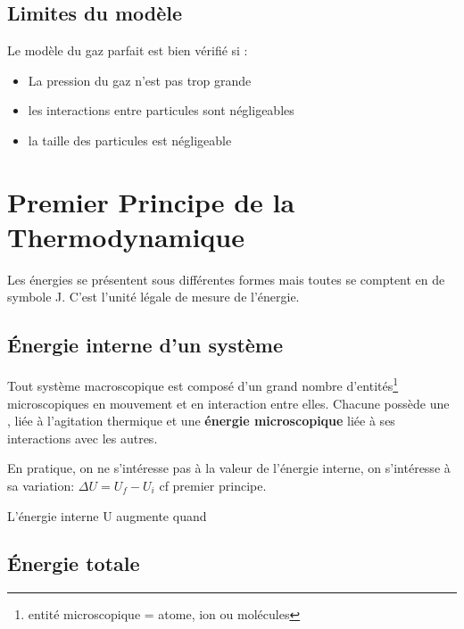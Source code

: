 \subsection{Limites du modèle}

Le modèle du gaz parfait est bien vérifié si :
\begin{itemize}
	\item La pression du gaz n'est pas trop grande
	\item les interactions entre particules sont négligeables
	\item la taille des particules est négligeable
\end{itemize}

\section{Premier Principe de la Thermodynamique}
 Les énergies se présentent sous différentes formes  mais toutes se comptent en  de symbole J. C'est l'unité légale de mesure de l'énergie.

\subsection{Énergie interne d'un système }
Tout système macroscopique est composé d'un grand nombre d'entités\footnote{entité microscopique = atome, ion ou molécules} microscopiques en mouvement et en interaction entre elles. Chacune possède une \textbf{}, liée à l'agitation thermique et une \textbf{énergie  microscopique} liée à ses interactions avec les autres.\\

En pratique, on ne s'intéresse pas à la valeur de l'énergie interne, on s'intéresse à sa variation: $\Delta U = U_f - U_i$ cf premier principe.

L'énergie interne U augmente quand 

\subsection{Énergie totale}

